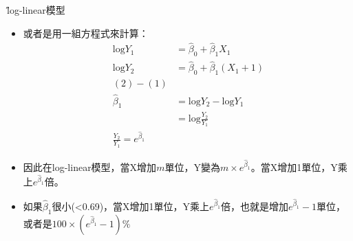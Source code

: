 \documentclass[xcolor=dvipsnames]{beamer}
\begin{document}
\begin{frame}{\H log-linear模型}
\begin{itemize}
\item 或者是用一組方程式來計算：
\begin{align}
\mathrm{log}Y_{1} & =\hat{\beta}_{0}+\hat{\beta}_{1}X_{1}\\
\mathrm{log}Y_{2} & =\hat{\beta}_{0}+\hat{\beta}_{1}(X_{1}+1)\\
(2)-(1)\\
\hat{\beta}_{1} & =\mathrm{log}Y_{2}-\mathrm{log}Y_{1}\\
 & =\mathrm{log}\frac{Y_{2}}{Y_{1}}\\
 \frac{Y_{2}}{Y_{1}}=e^{\hat{\beta}_{1}}
\end{align}
\item 因此在log-linear模型，當X增加$m$單位，Y變為$m\times e^{\hat{\beta}_{1}} $。當X增加1單位，Y乘上$e^{\hat{\beta}_{1}}$倍。
\item 如果$\hat{\beta}_{1}$很小(<0.69)，當X增加1單位，Y乘上$e^{\hat{\beta}_{1}}$倍，也就是增加$e^{\hat{\beta}_{1}}-1$單位，或者是$100 \times (e^{\hat{\beta}_{1}}-1)\%$
\end{itemize}
\end{frame}
\end{document}
